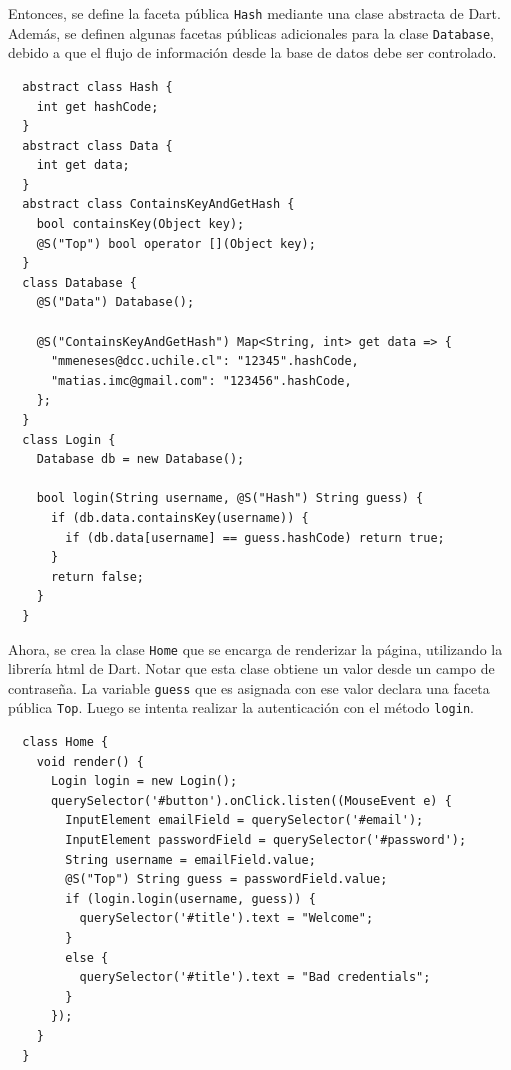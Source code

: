 Entonces, se define la faceta pública \texttt{Hash} mediante una clase abstracta de Dart. Además, se definen algunas facetas públicas adicionales para la clase \texttt{Database}, debido a que el flujo de información desde la base de datos debe ser controlado.
\vspace{0.5em}
\begin{lstlisting}
  abstract class Hash {
    int get hashCode;
  }
  abstract class Data {
    int get data;
  }
  abstract class ContainsKeyAndGetHash {
    bool containsKey(Object key);
    @S("Top") bool operator [](Object key);
  }
  class Database {
    @S("Data") Database();

    @S("ContainsKeyAndGetHash") Map<String, int> get data => {
      "mmeneses@dcc.uchile.cl": "12345".hashCode,
      "matias.imc@gmail.com": "123456".hashCode,
    };
  }
  class Login {
    Database db = new Database();

    bool login(String username, @S("Hash") String guess) {
      if (db.data.containsKey(username)) {
        if (db.data[username] == guess.hashCode) return true;
      }
      return false;
    }
  }
\end{lstlisting}

Ahora, se crea la clase \texttt{Home} que se encarga de renderizar la página, utilizando la librería html de Dart. Notar que esta clase obtiene un valor desde un campo de contraseña. La variable \texttt{guess} que es asignada con ese valor declara una faceta pública \texttt{Top}. Luego se intenta realizar la autenticación con el método \texttt{login}.
\vspace{0.5em}
\begin{lstlisting}
  class Home {
    void render() {
      Login login = new Login();
      querySelector('#button').onClick.listen((MouseEvent e) {
        InputElement emailField = querySelector('#email');
        InputElement passwordField = querySelector('#password');
        String username = emailField.value;
        @S("Top") String guess = passwordField.value;
        if (login.login(username, guess)) {
          querySelector('#title').text = "Welcome";
        }
        else {
          querySelector('#title').text = "Bad credentials";
        }
      });
    }
  }
\end{lstlisting}

